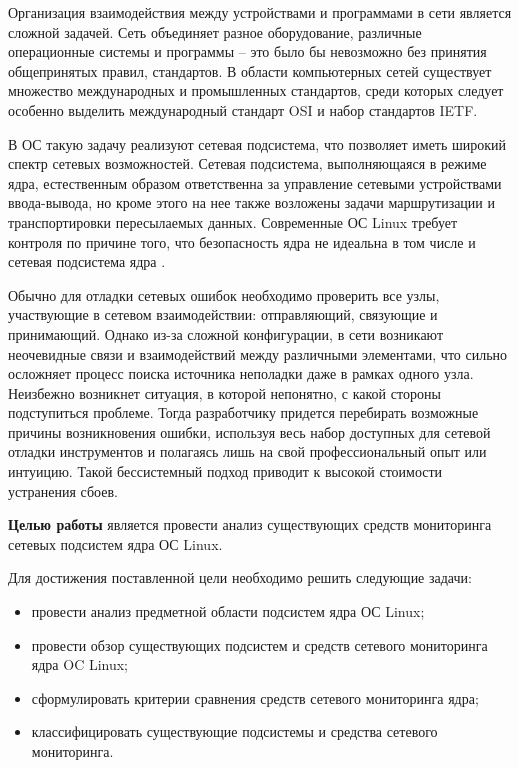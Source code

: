 Организация взаимодействия между устройствами и программами в сети является сложной задачей.
Сеть объединяет разное оборудование, различные операционные системы и программы – это было бы невозможно без принятия общепринятых правил, стандартов.
В области компьютерных сетей существует множество международных и промышленных стандартов, среди которых следует особенно выделить международный стандарт OSI и набор стандартов IETF.

В ОС такую задачу реализуют сетевая подсистема, что позволяет иметь широкий спектр сетевых возможностей. Сетевая подсистема, выполняющаяся в режиме ядра, естественным образом ответственна за управление сетевыми устройствами ввода-вывода, но кроме этого на нее также возложены задачи маршрутизации и транспортировки пересылаемых данных.
Современные ОС Linux требует контроля по причине того, что безопасность ядра не идеальна в том числе и сетевая подсистема ядра \cite{moduls_kernel_bugs, version_kernel_bugs}. 
 
Обычно для отладки сетевых ошибок необходимо проверить все узлы, участвующие в сетевом взаимодействии: отправляющий, связующие и принимающий. Однако из-за сложной конфигурации, в сети возникают неочевидные связи и взаимодействий между различными элементами, что сильно осложняет процесс поиска источника неполадки даже в рамках одного узла. Неизбежно возникнет ситуация, в которой непонятно, с какой стороны подступиться проблеме. Тогда разработчику придется перебирать возможные причины возникновения ошибки, используя весь набор доступных для сетевой отладки инструментов и полагаясь лишь на свой профессиональный опыт или интуицию. Такой бессистемный подход приводит к высокой стоимости устранения сбоев.

\textbf{Целью работы} является провести анализ существующих средств мониторинга сетевых подсистем ядра ОС Linux.

Для достижения поставленной цели необходимо решить следующие задачи:
\begin{itemize}[label=---]
	\item провести анализ предметной области подсистем ядра ОС Linux;
	\item провести обзор существующих подсистем и средств сетевого мониторинга ядра OC Linux;
	\item сформулировать критерии сравнения средств сетевого мониторинга ядра;
	\item классифицировать существующие подсистемы и средства сетевого мониторинга.
\end{itemize}